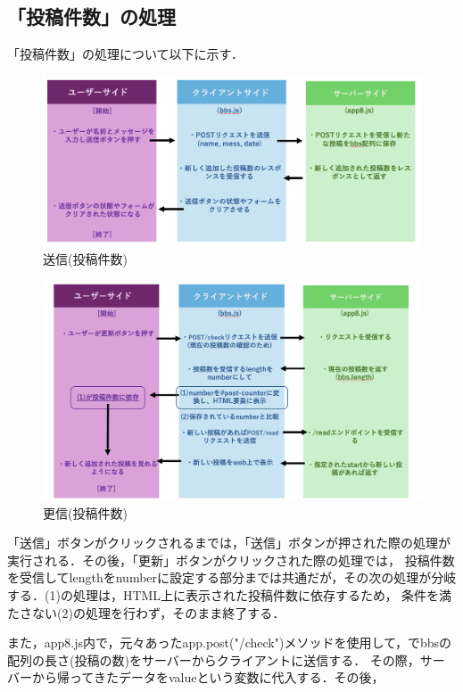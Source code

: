 \documentclass[uplatex,dvipdfmx]{jsarticle}
\begin{document}
\subsection{「投稿件数」の処理}
「投稿件数」の処理について以下に示す．
\begin{figure}[h]
    \centering
    \includegraphics[width=14cm]{送信.png}
    \caption{送信(投稿件数)}
    \label{fig:送信(投稿件数)}
\end{figure}

\begin{figure}[h]
    \centering
    \includegraphics[width=14cm]{更新2.png}
    \caption{更信(投稿件数)}
    \label{fig:更信(投稿件数)}
\end{figure}


「送信」ボタンがクリックされるまでは，「送信」ボタンが押された際の処理が実行される．その後，「更新」ボタンがクリックされた際の処理では，
投稿件数を受信してlengthをnumberに設定する部分までは共通だが，その次の処理が分岐する．(1)の処理は，HTML上に表示された投稿件数に依存するため，
条件を満たさない(2)の処理を行わず，そのまま終了する．

また，app8.js内で，元々あったapp.post("/check")メソッドを使用して，でbbsの配列の長さ(投稿の数)をサーバーからクライアントに送信する．
その際，サーバーから帰ってきたデータをvalueという変数に代入する．その後，
\end{document}
